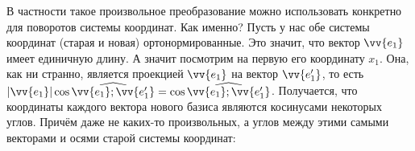 \documentclass{article}
\let\vec\vv
\begin{document}
\begin{itemize}
\begin{Comment}
        \end{Comment}
        \begin{Comment}
            В частности такое произвольное преобразование можно использовать конкретно для поворотов системы координат. Как именно? Пусть у нас обе системы координат (старая и новая) ортонормированные. Это значит, что вектор $\vec{e_1}$ имеет единичную длину. А значит посмотрим на первую его координату $x_1$. Она, как ни странно, является проекцией $\vec{e_1}$ на вектор $\vec{e_1'}$, то есть $|\vec{e_1}|\cos\widehat{\vec{e_1};\vec{e_1'}}=\cos\widehat{\vec{e_1};\vec{e_1'}}$. Получается, что координаты каждого вектора нового базиса являются косинусами некоторых углов. Причём даже не каких-то произвольных, а углов между этими самыми векторами и осями старой системы координат:\\
\end{Comment}
\end{itemize}
\end{document}
